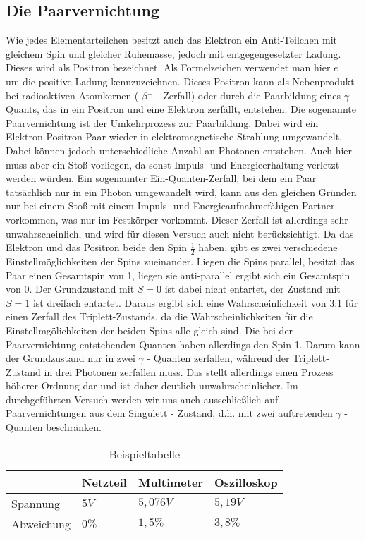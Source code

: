 \documentclass[11pt]{scrartcl}
\begin{document}
\subsection{Die Paarvernichtung}
Wie jedes Elementarteilchen besitzt auch das Elektron ein Anti-Teilchen mit gleichem Spin und gleicher Ruhemasse, jedoch mit entgegengesetzter Ladung. Dieses wird als Positron bezeichnet. Als Formelzeichen verwendet man hier $ e^{+} $ um die positive Ladung kennzuzeichnen. Dieses Positron kann als Nebenprodukt bei radioaktiven Atomkernen ( $\beta {^+} $ - Zerfall) oder durch die Paarbildung eines $\gamma $- Quants, das in ein Positron und eine Elektron zerfällt, entstehen. 
Die sogenannte Paarvernichtung ist der Umkehrprozess zur Paarbildung. Dabei wird ein Elektron-Positron-Paar wieder in elektromagnetische Strahlung umgewandelt. Dabei können jedoch unterschiedliche Anzahl an Photonen entstehen. Auch hier muss aber ein Stoß vorliegen, da sonst Impuls- und Energieerhaltung verletzt werden würden. Ein sogenannter Ein-Quanten-Zerfall, bei dem ein Paar tatsächlich nur in ein Photon umgewandelt wird, kann aus den gleichen Gründen nur bei einem Stoß mit einem Impuls- und Energieaufnahmefähigen Partner vorkommen, was nur im Festkörper vorkommt. Dieser Zerfall ist allerdings sehr unwahrscheinlich, und wird für diesen Versuch auch nicht berücksichtigt. 
Da das Elektron und das Positron beide den Spin $\frac{1}{2}$ haben, gibt es zwei verschiedene Einstellmöglichkeiten der Spins zueinander. Liegen die Spins parallel, besitzt das Paar einen Gesamtspin von 1, liegen sie anti-parallel ergibt sich ein Gesamtspin von 0. Der Grundzustand mit $S=0$ ist dabei nicht entartet, der Zustand mit $S=1$ ist dreifach entartet. Daraus ergibt sich eine Wahrscheinlichkeit von 3:1 für einen Zerfall des Triplett-Zustands, da die Wahrscheinlichkeiten für die Einstellmgölichkeiten der beiden Spins alle gleich sind. Die bei der Paarvernichtung entstehenden Quanten haben allerdings den Spin 1. Darum kann der Grundzustand nur in zwei $\gamma$ - Quanten zerfallen, während der Triplett-Zustand in drei Photonen zerfallen muss. Das stellt allerdings einen Prozess höherer Ordnung dar und ist daher deutlich unwahrscheinlicher. Im durchgeführten Versuch werden wir uns auch ausschließlich auf Paarvernichtungen aus dem Singulett - Zustand, d.h. mit zwei auftretenden $\gamma$ - Quanten beschränken.

\begin{table}
	\caption{Beispieltabelle}
	\begin{tabular}{|l|l|l|l|}
	\hline
	 & Netzteil & Multimeter & Oszilloskop \\ \hline
	Spannung & $5V$ & $ 5,076 V $ & $ 5,19 V $ \\ \hline
	Abweichung & $0\%$ & $1,5\%$ & $3,8\%$ \\ \hline
	\end{tabular}
\label{tab1}
\end{table}
\end{document}
